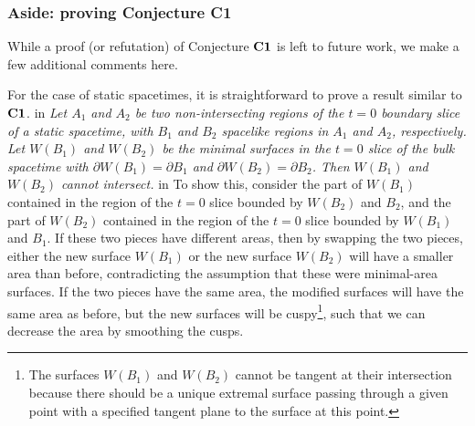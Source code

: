 \documentclass[12pt]{article}
\renewcommand{\(}{\left(}
\renewcommand{\)}{\right)}
\begin{document}
\subsubsection*{Aside: proving Conjecture C1}

While a proof (or refutation) of Conjecture ${\bf C1}$ is left to future work, we make a few additional comments here.

For the case of static spacetimes, it is straightforward to prove a result similar to ${\bf C1}$.
 in
\noindent
{\it Let  $A_1$ and $A_2$ be two non-intersecting regions of the $t=0$
boundary slice of a static spacetime, with $B_1$ and $B_2$ spacelike regions
in $A_1$ and $A_2$, respectively.  Let $W(B_1)$ and $W(B_2)$ be the minimal
surfaces in the $t=0$ slice of the bulk spacetime with
$\partial W(B_1) = \partial B_1$ and $\partial W(B_2) = \partial B_2$.
Then $W(B_1)$ and $W(B_2)$ cannot intersect.}
 in
\noindent
To show this, consider the part of $W(B_1)$ contained in the region of the $t=0$ slice bounded by $W(B_2)$ and $B_2$, and the part of $W(B_2)$ contained in the region of the $t=0$ slice bounded by $W(B_1)$ and $B_1$. If these two pieces have different areas, then by swapping the two pieces, either the new surface $W(B_1)$ or the new surface $W(B_2)$ will have a smaller area than before, contradicting the assumption that these were minimal-area surfaces. If the two pieces have the same area, the modified surfaces will have the same area as before, but the new surfaces will be cuspy\footnote{The surfaces $W(B_1)$ and $W(B_2)$ cannot be tangent at their intersection because there should be a unique extremal surface passing through a given point with a specified tangent plane to the surface at this point.}, such that we can decrease the area by smoothing the cusps.
\end{document}
